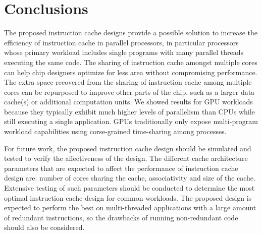\section{Conclusions}

The proposed instruction cache designs provide a possible solution to 
increase the efficiency of instruction cache in parallel processors, 
in particular processors whose primary workload includes single programs
with many parallel threads executing the same code. 
The sharing of instruction cache amongst multiple cores can help 
chip designers optimize for less area without compromising performance. 
The extra space recovered from the sharing of instruction cache among 
multiple cores can be repurposed to improve other parts of the 
chip, such as a larger data cache(s) or additional computation units.
We showed results for GPU workloads because they typically exhibit much 
higher levels of parallelism than CPUs while still executing a single 
application.
GPUs traditionally only expose multi-program workload capabilities 
using corse-grained time-sharing among processes.

For future work, the proposed instruction cache design should be 
simulated and tested to verify the affectiveness of the design. 
The different cache architecture parameters that are expected to 
affect the performance of instruction cache design are: number of 
cores sharing the cache, associativity and size of the cache. 
Extensive testing of such parameters should be conducted to determine 
the most optimal instruction cache design for common workloads. 
The proposed design is expected to perform the best on multi-threaded 
applications with a large amount of redundant instructions, so the 
drawbacks of running non-redundant code should also be considered.
